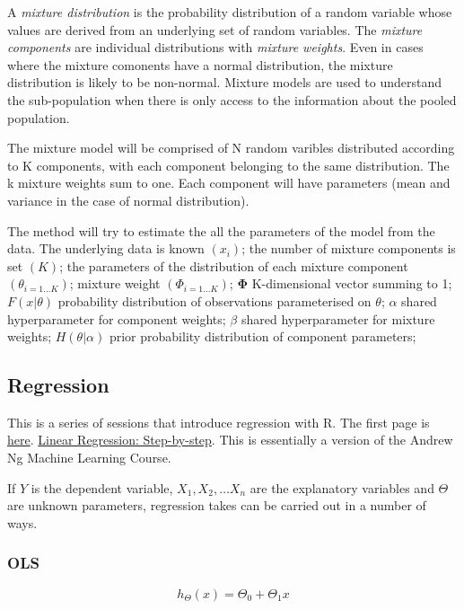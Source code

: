 \documentclass[12pt, a4paper, oneside]{article}\usepackage{graphicx, color}
\begin{document}
A \emph{mixture distribution} is the probability distribution of a random variable  whose values are derived from an underlying set of random variables. The \emph{mixture components} are individual distributions with \emph{mixture weights}.  Even in cases where the mixture comonents have a normal distribution, the mixture distribution is likely to be non-normal. Mixture models are used to understand the sub-population when there is only access to the information about the pooled population. 

The mixture model will be comprised of N random varibles distributed according to K components, with each component belonging to the same distribution. The k mixture weights sum to one. Each component will have parameters (mean and variance in the case of normal distribution).  

The method will try to estimate the all the parameters of the model from the data.  The underlying data is known $(x_i)$; the number of mixture components is set $(K)$; the parameters of the distribution of each mixture component $(\theta_{i=1\dots K})$; mixture weight $(\Phi_{i = 1\dots K})$; $\mathbf{\Phi}$ K-dimensional vector summing to 1; $F(x|\theta)$ probability distribution of observations parameterised on $\theta$; $\alpha$ shared hyperparameter for component weights; $\beta$ shared hyperparameter for mixture weights; $H(\theta|\alpha)$ prior probability distribution of component parameters; 


\subsection{Regression}
This is a series of sessions that introduce regression with R.  The first page is \href{http://pingax.com/2013/11/}{here}.  \href{http://pingax.com/linear-regression-with-r-step-by-step-implementation-part-1/}{Linear Regression: Step-by-step}. This is essentially a version of the Andrew Ng Machine Learning Course.  

If $Y$ is the dependent variable, $X_1, X_2, \dots X_n$ are the explanatory variables and $\Theta$ are unknown parameters, regression takes can be carried out in a number of ways. 

\subsubsection{OLS}
\begin{equation}
h_{\Theta}(x) = \Theta_0 + \Theta_1 x
\end{equation}
\end{document}
